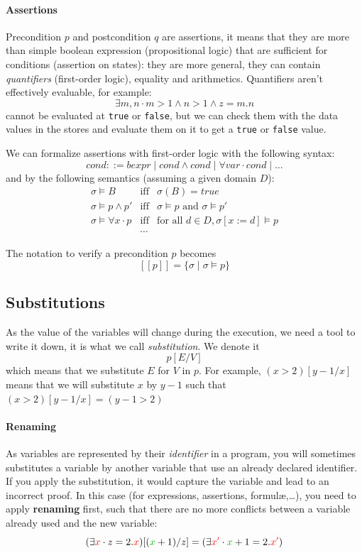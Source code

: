 \documentclass[12pt, a4paper]{book}
\begin{document}
\paragraph{Assertions} Precondition $p$ and postcondition $q$ are assertions, it
means that they are more than simple boolean expression (propositional logic)
that are sufficient for conditions (assertion on states): they are more general,
they can contain \textit{quantifiers} (first-order logic), equality and
arithmetics. Quantifiers aren't effectively evaluable, for example:
$$
\exists m, n \cdot m > 1 \land n > 1 \land z = m.n
$$
cannot be evaluated at \verb#true# or \verb#false#, but we can check them with
the data values in the stores and evaluate them on it to get a \verb#true# or
\verb#false# value. \newline

We can formalize assertions with first-order logic with the following syntax:
$$
cond ::= bexpr \mid cond \land cond \mid \forall var \cdot cond \mid \ldots
$$
and by the following semantics (assuming a given domain $D$):
\begin{eqnarray*}
    \sigma \vDash B          & \textrm{iff} & \sigma(B) = true \\
    \sigma \vDash p \land p' & \textrm{iff} & \sigma \vDash p \textrm{ and } \sigma \vDash p' \\
    \sigma \vDash \forall x \cdot p & \textrm{iff} & \textrm{for all } d \in D, \sigma[x:=d] \vDash p \\
    & \cdots &
\end{eqnarray*}

The notation to verify a precondition $p$ becomes
$$
[[p]] = \{\sigma \mid \sigma \vDash p\}
$$

\subsection{Substitutions}
\label{sub:Substitutions}

As the value of the variables will change during the execution, we need a tool
to write it down, it is what we call \textit{substitution}. We denote it
$$
p[E/V]
$$
which means that we substitute $E$ for $V$ in $p$. For example,
$(x>2)[y-1/x]$ means that we will substitute $x$ by $y-1$ such that
$(x>2)[y-1/x]=(y-1>2)$

\paragraph{Renaming} As variables are represented by their \textit{identifier}
in a program, you will sometimes substitutes a variable by another variable that
use an already declared identifier. If you apply the substitution, it would
capture the variable and lead to an incorrect proof. In this case (for
expressions, assertions, formul\ae{},\ldots), you need to
apply \textbf{renaming} first, such that there are no more conflicts between
a variable already used and the new variable:
$$
(\exists \textcolor{red}{x} \cdot z = 2.\textcolor{red}{x})[(\textcolor{green!70!black}{x}+1)/z] = (\exists \textcolor{red}{x'} \cdot \textcolor{green!70!black}{x}+1 = 2.\textcolor{red}{x'})
$$
\end{document}
